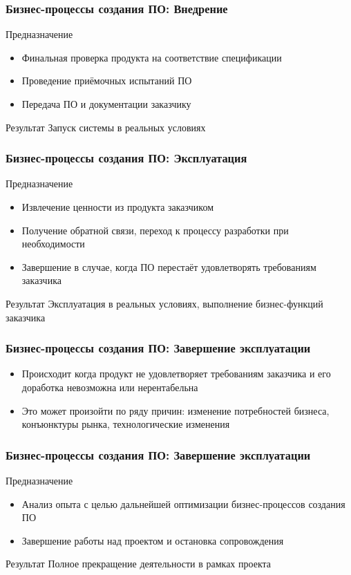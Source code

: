 \documentclass{../industrial-development}
\begin{document}
\begin{frame} \frametitle{Бизнес-процессы создания ПО: Внедрение}
	\begin{block}{Предназначение}
		\begin{itemize}
			\item Финальная проверка продукта на соответствие спецификации
			\item Проведение приёмочных испытаний ПО
			\item Передача ПО и документации заказчику
		\end{itemize}
	\end{block}
	\begin{block}{Результат}
		Запуск системы в реальных условиях
	\end{block}
\end{frame}
\lecturenotes


\begin{frame} \frametitle{Бизнес-процессы создания ПО: Эксплуатация}
	\begin{block}{Предназначение}
		\begin{itemize}
			\item Извлечение ценности из продукта заказчиком
			\item Получение обратной связи, переход к процессу разработки при необходимости
			\item Завершение в случае, когда ПО перестаёт удовлетворять требованиям заказчика
		\end{itemize}
	\end{block}
	\begin{block}{Результат}
		Эксплуатация в реальных условиях, выполнение бизнес-функций заказчика
	\end{block}
\end{frame}
\lecturenotes


\begin{frame} \frametitle{Бизнес-процессы создания ПО: Завершение эксплуатации}
	\begin{itemize}
		\item Происходит когда продукт не удовлетворяет требованиям заказчика и его доработка невозможна или нерентабельна
		\item Это может произойти по ряду причин: изменение потребностей бизнеса, конъюнктуры рынка, технологические изменения
	\end{itemize}
\end{frame}
\lecturenotes


\begin{frame} \frametitle{Бизнес-процессы создания ПО: Завершение эксплуатации}
	\begin{block}{Предназначение}
		\begin{itemize}
			\item Анализ опыта с целью дальнейшей оптимизации бизнес-процессов создания ПО
			\item Завершение работы над проектом и остановка сопровождения
		\end{itemize}
	\end{block}
	\begin{block}{Результат}
		Полное прекращение деятельности в рамках проекта
	\end{block}
\end{frame}
\lecturenotes
\end{document}
